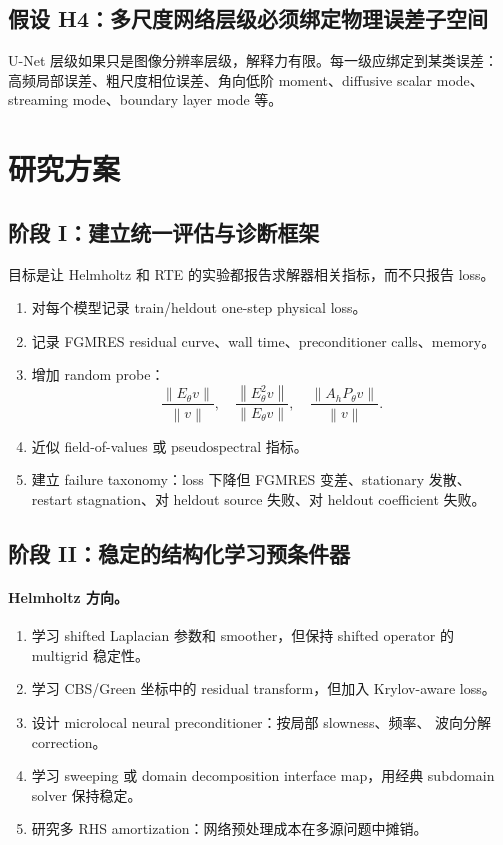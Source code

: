 \documentclass[UTF8,11pt,fontset=fandol]{ctexart}
\newcommand{\norm}[1]{\left\lVert #1 \right\rVert}
\begin{document}
\subsection*{假设 H4：多尺度网络层级必须绑定物理误差子空间}

U-Net 层级如果只是图像分辨率层级，解释力有限。每一级应绑定到某类误差：
高频局部误差、粗尺度相位误差、角向低阶 moment、diffusive scalar mode、
streaming mode、boundary layer mode 等。

\section{研究方案}

\subsection{阶段 I：建立统一评估与诊断框架}

目标是让 Helmholtz 和 RTE 的实验都报告求解器相关指标，而不只报告 loss。

\begin{enumerate}[leftmargin=2em]
  \item 对每个模型记录 train/heldout one-step physical loss。
  \item 记录 FGMRES residual curve、wall time、preconditioner calls、memory。
  \item 增加 random probe：
  \[
    \frac{\norm{E_\theta v}}{\norm v},\quad
    \frac{\norm{E_\theta^2 v}}{\norm{E_\theta v}},\quad
    \frac{\norm{A_hP_\theta v}}{\norm v}.
  \]
  \item 近似 field-of-values 或 pseudospectral 指标。
  \item 建立 failure taxonomy：loss 下降但 FGMRES 变差、stationary 发散、
  restart stagnation、对 heldout source 失败、对 heldout coefficient 失败。
\end{enumerate}

\subsection{阶段 II：稳定的结构化学习预条件器}

\paragraph{Helmholtz 方向。}
\begin{enumerate}[leftmargin=2em]
  \item 学习 shifted Laplacian 参数和 smoother，但保持 shifted operator
  的 multigrid 稳定性。
  \item 学习 CBS/Green 坐标中的 residual transform，但加入 Krylov-aware
  loss。
  \item 设计 microlocal neural preconditioner：按局部 slowness、频率、
  波向分解 correction。
  \item 学习 sweeping 或 domain decomposition interface map，用经典
  subdomain solver 保持稳定。
  \item 研究多 RHS amortization：网络预处理成本在多源问题中摊销。
\end{enumerate}
\end{document}
